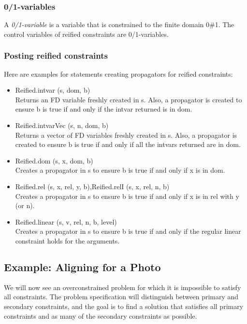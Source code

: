 \documentclass[a4paper,halfparskip]{scrartcl}
\begin{document}
\subsubsection{0/1-variables}
A \emph{0/1-variable} is a variable that is constrained to the finite 
domain 0$\#$1. The control variables of reified constraints are 0/1-variables. 

\subsubsection{Posting reified constraints}
Here are examples for statements creating propagators for 
reified constraints: 
\begin{itemize}
\item
Reified.intvar (s, dom, b)\\
Returns an FD variable freshly created in s. Also, a propagator 
is created to ensure b is true if and only if the intvar returned is in dom.
\item 
Reified.intvarVec (s, n, dom, b)\\
Returns a vector of FD variables freshly created in s. Also, a 
propagator is created to ensure b is true if and only if all the 
intvars returned are in dom. 
\item
Reified.dom (s, x, dom, b)\\
Creates a propagator in s to ensure b is true if and only if x is in dom. 
\item
Reified.rel (s, x, rel, y, b),Reified.relI (s, x, rel, n, b)\\
Creates a propagator in s to ensure b is true if and only if x 
is in rel with y (or n). 
\item
Reified.linear (s, v, rel, n, b, level)\\
Creates a propagator in s to ensure b is true if and only 
if the regular linear constraint holds for the arguments. 
\end{itemize}


\newpage
\subsection{Example: Aligning for a Photo}
\label{sec8-2}
We will now see an overconstrained problem for which it is impossible 
to satisfy all constraints. The problem specification will distinguish 
between primary and secondary constraints, and the goal is to find a 
solution that satisfies all primary constraints and as many of the 
secondary constraints as possible.
\end{document}
